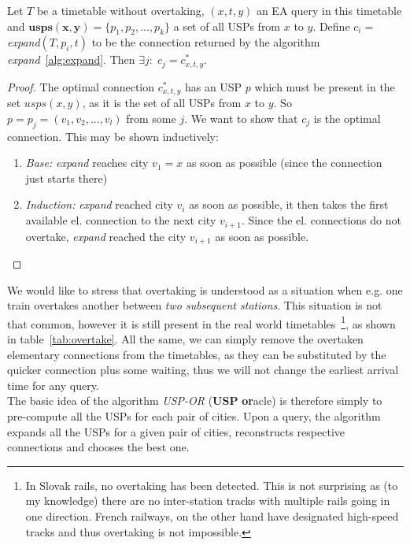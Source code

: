     \begin{lemma}
    	\label{lemma:expandusp}
    	Let $T$ be a timetable without overtaking, $(x, t, y)$ an EA query in this timetable and $\bm{usps(x, y)} = \{p_{1}, p_{2}, ..., p_{k}\}$ a set of all USPs from $x$ to $y$. Define $c_{i} = $\textit{expand}$(T, p_{i}, t)$ to be the connection returned by the algorithm \textit{expand}~\ref{alg:expand}. Then $\exists j:\; c_{j} = c_{x, t, y}^{*}$.
    \end{lemma}
    \begin{proof}
    	The optimal connection $c_{x, t, y}^{*}$ has an USP $p$ which must be present in the set $usps(x, y)$, as it is the set of all USPs from $x$ to $y$. So $p = p_{j} = (v_{1}, v_{2},..., v_{l})$ from some $j$. We want to show that $c_{j}$ is the optimal connection. This may be shown inductively:
    	\begin{enumerate}
    		\item \textit{Base:} \textit{expand} reaches city $v_{1} = x$ as soon as possible (since the connection just starts there)
    		\item \textit{Induction:} \textit{expand} reached city $v_{i}$ as soon as possible, it then takes the first available el. connection to the next city $v_{i + 1}$. Since the el. connections do not overtake, \textit{expand} reached the city $v_{i + 1}$ as soon as possible.
    	\end{enumerate}
    \end{proof}
    
    \noindent We would like to stress that overtaking is understood as a situation when e.g. one train overtakes another between \textit{two subsequent stations}. This situation is not that common, however it is still present in the real world timetables~\footnote{In Slovak rails, no overtaking has been detected. This is not surprising as (to my knowledge) there are no inter-station tracks with multiple rails going in one direction. French railways, on the other hand have designated high-speed tracks and thus overtaking is not impossible.}, as shown in table~\ref{tab:overtake}. All the same, we can simply remove the overtaken elementary connections from the timetables, as they can be substituted by the quicker connection plus some waiting, thus we will not change the earliest arrival time for any query. \\
	
	\noindent The basic idea of the algorithm \textit{USP-OR} (\textbf{USP} \textbf{or}acle) is therefore simply to pre-compute all the USPs for each pair of cities. Upon a query, the algorithm expands all the USPs for a given pair of cities, reconstructs respective connections and chooses the best one. \\
	
